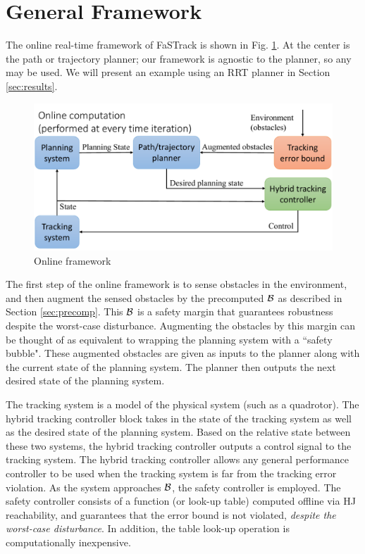 \section{General Framework \label{sec:framework}}
The online real-time framework of FaSTrack is shown in Fig. \ref{fig:fw_online}. At the center is the path or trajectory planner; our framework is agnostic to the planner, so any may be used. We will present an example using an RRT planner in Section \ref{sec:results}.
\begin{figure}[]
  \centering
	\includegraphics[width=1\columnwidth]{fig/framework_online}
	\caption{Online framework}
	\label{fig:fw_online}
	\vspace{-.1in}
\end{figure}

The first step of the online framework is to sense obstacles in the environment, and then augment the sensed obstacles by the precomputed $\mathcal B$ as described in Section \ref{sec:precomp}. This $\mathcal B$ is a safety margin that guarantees robustness despite the worst-case disturbance. Augmenting the obstacles by this margin can be thought of as equivalent to wrapping the planning system with a ``safety bubble". These augmented obstacles are given as inputs to the planner along with the current state of the planning system. The planner then outputs the next desired state of the planning system. 

The tracking system is a model of the physical system (such as a quadrotor). The hybrid tracking controller block takes in the state of the tracking system as well as the desired state of the planning system. Based on the relative state between these two systems, the hybrid tracking controller outputs a control signal to the tracking system. The hybrid tracking controller allows any general performance controller to be used when the tracking system is far from the tracking error violation. As the system approaches $\mathcal B$, the safety controller is employed.  The safety controller consists of a function (or look-up table) computed offline via HJ reachability, and guarantees that the error bound is not violated, \textit{despite the worst-case disturbance}. In addition, the table look-up operation is computationally inexpensive.

